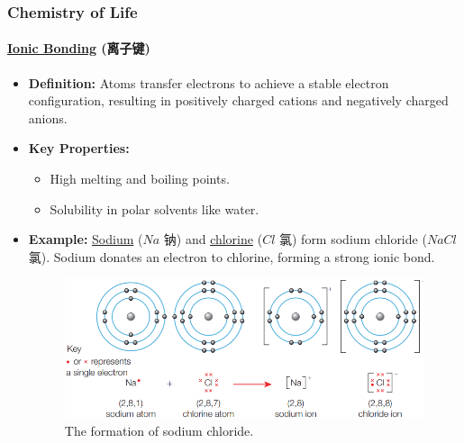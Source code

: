 
\subsubsection{Chemistry of Life}
\paragraph{\underline{Ionic Bonding} (离子键)}
\begin{itemize}
    \item \textbf{Definition:} Atoms transfer electrons to achieve a stable electron configuration, resulting in positively
    charged cations and negatively charged anions.
    \item \textbf{Key Properties:}
    \begin{itemize}
        \item High melting and boiling points.
        \item Solubility in polar solvents like water.
    \end{itemize}
    \item \textbf{Example:} \underline{Sodium} ($Na$ 钠) and \underline{chlorine} ($Cl$ 氯) form sodium chloride ($NaCl$ 氯).
    Sodium donates an electron to chlorine, forming a strong ionic bond.
    \begin{figure}[H]
        \centering
        \includegraphics[scale=0.8]{Biology/1A/Images/1A-1-1.png}
        \caption{The formation of sodium chloride.}
    \end{figure}
\end{itemize}

